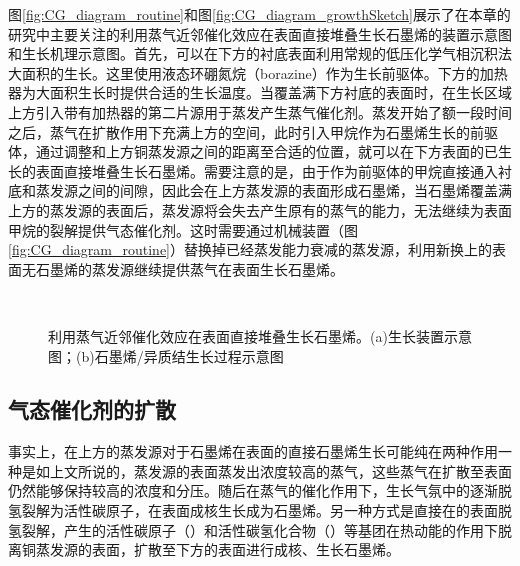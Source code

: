     图\ref{fig:CG_diagram_routine}和图\ref{fig:CG_diagram_growthSketch}展示了在本章的研究中主要关注的利用蒸气近邻催化效应在表面直接堆叠生长石墨烯的装置示意图和生长机理示意图。首先，可以在下方的衬底表面利用常规的低压化学气相沉积法大面积的生长。这里使用液态环硼氮烷（borazine）作为生长前驱体。下方的加热器为大面积生长时提供合适的生长温度。当覆盖满下方衬底的表面时，在生长区域上方引入带有加热器的第二片源用于蒸发产生蒸气催化剂。蒸发开始了额一段时间之后，蒸气在扩散作用下充满上方的空间，此时引入甲烷作为石墨烯生长的前驱体，通过调整和上方铜蒸发源之间的距离至合适的位置，就可以在下方表面的已生长的表面直接堆叠生长石墨烯。需要注意的是，由于作为前驱体的甲烷直接通入衬底和蒸发源之间的间隙，因此会在上方蒸发源的表面形成石墨烯，当石墨烯覆盖满上方的蒸发源的表面后，蒸发源将会失去产生原有的蒸气的能力，无法继续为表面甲烷的裂解提供气态催化剂。这时需要通过机械装置（图\ref{fig:CG_diagram_routine}）替换掉已经蒸发能力衰减的蒸发源，利用新换上的表面无石墨烯的蒸发源继续提供蒸气在表面生长石墨烯。

    \begin{figure}[htb]
        \\[-0.5ex]
        \caption{利用蒸气近邻催化效应在表面直接堆叠生长石墨烯。(a)生长装置示意图；(b)石墨烯/异质结生长过程示意图}
        \label{fig:CG_diagram_CVD}
    \end{figure}

    \subsection{气态催化剂的扩散}
    \label{CG:FEM_CuVapor}
    事实上，在上方的蒸发源对于石墨烯在表面的直接石墨烯生长可能纯在两种作用\chinesecolon 一种是如上文所说的，蒸发源的表面蒸发出浓度较高的蒸气，这些蒸气在扩散至表面仍然能够保持较高的浓度和分压。随后在蒸气的催化作用下，生长气氛中的逐渐脱氢裂解为活性碳原子，在表面成核生长成为石墨烯。另一种方式是直接在的表面脱氢裂解，产生的活性碳原子（）和活性碳氢化合物（）等基团在热动能的作用下脱离铜蒸发源的表面，扩散至下方的表面进行成核、生长石墨烯。

